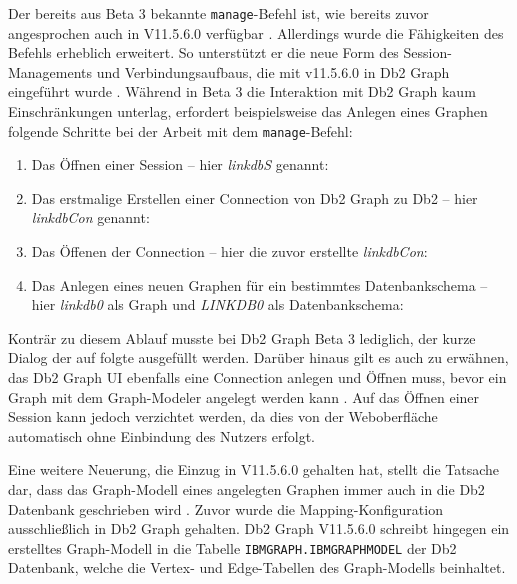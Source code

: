Der bereits aus Beta 3 bekannte \texttt{manage}-Befehl ist, wie bereits zuvor angesprochen auch in V11.5.6.0 verfügbar \cite{ibm_docs_db2_graph_commands}. Allerdings wurde die Fähigkeiten des Befehls erheblich erweitert. So unterstützt er die neue Form des Session-Managements und Verbindungsaufbaus, die mit v11.5.6.0 in Db2 Graph eingeführt wurde \cite{ibm_docs_db2_graph_commands}. Während in Beta 3 die Interaktion mit Db2 Graph kaum Einschränkungen unterlag, erfordert beispielsweise das Anlegen eines Graphen folgende Schritte bei der Arbeit mit dem \texttt{manage}-Befehl:

\begin{enumerate}
    \item Das Öffnen einer Session -- hier \textit{linkdbS} genannt:\\
    \item Das erstmalige Erstellen einer Connection von Db2 Graph zu Db2 -- hier \textit{linkdbCon} genannt:\\
    \item Das Öffenen der Connection -- hier die zuvor erstellte \textit{linkdbCon}:\\
    \item Das Anlegen eines neuen Graphen für ein bestimmtes Datenbankschema -- hier \textit{linkdb0} als Graph und \textit{LINKDB0} als Datenbankschema:\\ 
\end{enumerate}

Konträr zu diesem Ablauf musste bei Db2 Graph Beta 3 lediglich, der kurze Dialog der auf  folgte ausgefüllt werden. Darüber hinaus gilt es auch zu erwähnen, das Db2 Graph UI ebenfalls eine Connection anlegen und Öffnen muss, bevor ein Graph mit dem Graph-Modeler angelegt werden kann \cite{ibm_docs_db2_graph_ui}. Auf das Öffnen einer Session kann jedoch verzichtet werden, da dies von der Weboberfläche automatisch ohne Einbindung des Nutzers erfolgt.

Eine weitere Neuerung, die Einzug in V11.5.6.0 gehalten hat, stellt die Tatsache dar, dass das Graph-Modell eines angelegten Graphen immer auch in die Db2 Datenbank geschrieben wird \cite{ibm_docs_privileges}. Zuvor wurde die Mapping-Konfiguration ausschließlich in Db2 Graph gehalten. Db2 Graph V11.5.6.0 schreibt hingegen ein erstelltes Graph-Modell in die Tabelle \texttt{IBMGRAPH.IBMGRAPHMODEL} der Db2 Datenbank, welche die Vertex- und Edge-Tabellen des Graph-Modells beinhaltet. 

